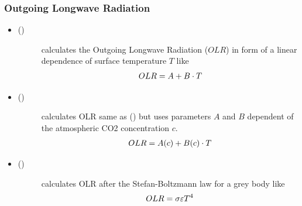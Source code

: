 \documentclass[a4paper,10pt,english]{sphinxmanual}
\begin{document}
\subsubsection{Outgoing Longwave Radiation}
\label{models:outgoing-longwave-radiation}\begin{itemize}
\item {} \begin{description}
\item[{{\hyperref[api/climlab.radiation:climlab.radiation.AplusBT.AplusBT]{\emph{}}} ()}] \leavevmode
calculates the Outgoing Longwave Radiation (\(OLR\)) in form of a linear dependence of surface temperature \(T\) like
\begin{gather}
\begin{split}OLR = A+B \cdot T\end{split}\notag
\end{gather}
\end{description}

\item {} \begin{description}
\item[{{\hyperref[api/climlab.radiation:climlab.radiation.AplusBT.AplusBT_CO2]{\emph{}}} ()}] \leavevmode
calculates OLR same as {\hyperref[api/climlab.radiation:climlab.radiation.AplusBT.AplusBT]{\emph{}}} () but uses parameters \(A\) and \(B\) dependent of the atmospheric CO2 concentration \(c\).
\begin{gather}
\begin{split}OLR = A(c)+B(c) \cdot T\end{split}\notag
\end{gather}
\end{description}

\item {} \begin{description}
\item[{{\hyperref[api/climlab.radiation:climlab.radiation.Boltzmann.Boltzmann]{\emph{}}} ()}] \leavevmode
calculates OLR after the Stefan-Boltzmann law for a grey body like
\begin{gather}
\begin{split}OLR = \sigma \varepsilon T^4\end{split}\notag
\end{gather}
\end{description}

\end{itemize}
\end{document}
